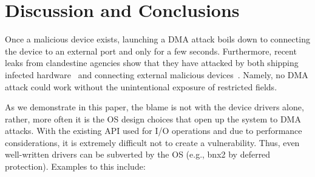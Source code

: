 

\section{Discussion and Conclusions}


Once a malicious device exists, launching a DMA attack boils down to connecting the device to an external port and only for a few seconds. Furthermore, recent leaks from clandestine agencies show that they have attacked by both shipping infected hardware~\cite{Gal14} and connecting external malicious devices~\cite{Fin14}. Namely, no DMA attack could work without the unintentional exposure of restricted fields.

\begin{comment}
\footnote{\url{https://lore.kernel.org/lkml/20180510230948.GF190385@bhelgaas-glaptop.roam.corp.google.com/}}.
\end{comment}

As we demonstrate in this paper, the blame is not with the device drivers alone, rather, more often it is the OS design choices that open up the system to DMA attacks. With the existing API used for I/O operations and due to performance considerations, it is extremely difficult not to create a \subpage{} vulnerability. Thus, even well-written drivers can be subverted by the OS (e.g., bnx2 by deferred protection). Examples to this include:

